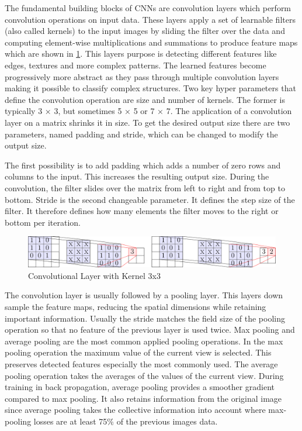 \documentclass[
a4paper, 
12pt,
grayscalebody, %
abstract=on,
twoside, BCOR10mm, 12pt, DIV13,headinclude, footexclude, final, abstracton, openright
]{ibireprt}
\numberwithin{equation}{chapter}
\numberwithin{table}{chapter}
\numberwithin{figure}{chapter}
\numberwithin{algorithm}{chapter}
\numberwithin{example}{chapter}
\numberwithin{example}{chapter}
\begin{document}
The fundamental building blocks of CNNs are convolution layers which perform convolution operations on input data. These layers apply a set of learnable filters (also called kernels) to the input images by sliding the filter over the data and computing element-wise multiplications and summations to produce feature maps which are shown in \ref{fig:fig2}. This layers purpose is detecting different features like edges, textures and more complex patterns. The learned features become progressively more abstract as they pass through multiple convolution layers making it possible to classify complex structures. Two key hyper parameters that define the convolution operation are size and number of kernels. The former is typically 3 × 3, but sometimes 5 × 5 or 7 × 7. The application of a convolution layer on a matrix shrinks it in size. To get the desired output size there are two parameters, named padding and stride, which can be changed to modify the output size. 
 
 The first possibility is to add padding which adds a number of zero rows and columns to the input. This increases the resulting output size. During the convolution, the filter slides over the matrix from left to right and from top to bottom. Stride is the second changeable parameter. It defines the step size of the filter. It therefore defines how many elements the filter moves to the right or bottom per iteration.
  
  
\begin{figure}[h]
	\center
	\includegraphics[width = 1 \textwidth]{3x3_conv_layer.png}%
	\caption{Convolutional Layer with Kernel 3x3 \cite{Walle2023}}
	\label{fig:fig2}
\end{figure}


The convolution layer is usually followed by a pooling layer. This layers down sample the feature maps, reducing the spatial dimensions while retaining important information. Usually the stride matches the field size of the pooling operation so that no feature of the previous layer is used twice. Max pooling and average pooling are the most common applied pooling operations. In the max pooling operation the maximum value of the current view is selected. This preserves detected features especially the most commonly used. The average pooling operation takes the averages of the values of the current view. During training in back propagation, average pooling provides a smoother gradient compared to max pooling. It also retains information from the original image since average pooling takes the collective information into account where max-pooling losses are at least 75\% of the previous images data. 
\end{document}
